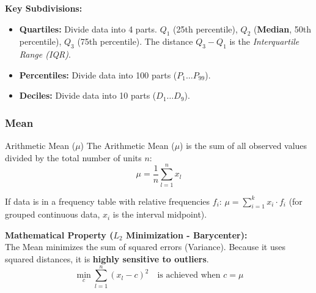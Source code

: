\textbf{Key Subdivisions:}
\begin{itemize}
    \item \textbf{Quartiles:} Divide data into 4 parts. $Q_1$ (25th percentile), $Q_2$ (\textbf{Median}, 50th percentile), $Q_3$ (75th percentile). The distance $Q_3 - Q_1$ is the \textit{Interquartile Range (IQR)}.
    \item \textbf{Percentiles:} Divide data into 100 parts ($P_1 \dots P_{99}$).
    \item \textbf{Deciles:} Divide data into 10 parts ($D_1 \dots D_9$).
\end{itemize}

\subsubsection{Mean}

\begin{defbox}{Arithmetic Mean ($\mu$)}
The Arithmetic Mean ($\mu$) is the sum of all observed values divided by the total number of units $n$:
\begin{equation}
    \mu = \frac{1}{n} \sum_{l=1}^{n} x_l
\end{equation}
\end{defbox}

If data is in a frequency table with relative frequencies $f_i$: $\mu = \sum_{i=1}^{k} x_i \cdot f_i$ (for grouped continuous data, $x_i$ is the interval midpoint).

\vs
\textbf{Mathematical Property ($L_2$ Minimization - Barycenter):} \\
The Mean minimizes the sum of squared errors (Variance). Because it uses squared distances, it is \textbf{highly sensitive to outliers}.
\begin{equation}
    \min_c \sum_{l=1}^{n} (x_l - c)^2 \quad \text{is achieved when } c = \mu
\end{equation}

